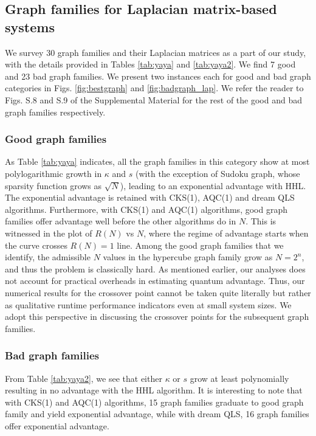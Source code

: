 \documentclass[%
 reprint,
 superscriptaddress,
 amsmath,amssymb,
 aps,
 pra,
floatfix,
nofootinbib,
]{revtex4-2}
\theoremstyle{definition}
\theoremstyle{remark}
\begin{document}
\subsection{Graph families for Laplacian matrix-based systems} \label{sec:LG} 

We survey 30 graph families and their Laplacian matrices as a part of our study, with the details provided in Tables \ref{tab:yaya} and \ref{tab:yaya2}. We find 7 good and 23 bad graph families. We present two instances each for good and bad graph categories in Figs. \ref{fig:bestgraph} and \ref{fig:badgraph_lap}. We refer the reader to Figs. S.8 and S.9 of the Supplemental Material for the rest of the good and bad graph families respectively. 

\subsubsection{Good graph families} 

As Table \ref{tab:yaya} indicates, all the graph families in this category show at most polylogarithmic growth in $\kappa$ and $s$ (with the exception of Sudoku graph, whose sparsity function grows as $\sqrt{N}$), leading to an exponential advantage with HHL. The exponential advantage is retained with CKS(1), AQC(1) and dream QLS algorithms. Furthermore, with CKS(1) and AQC(1) algorithms, good graph families offer advantage well before the other algorithms do in $N$. This is witnessed in the plot of $R(N)$ vs $N$, where the regime of advantage starts when the curve crosses $R({N})=1$ line. Among the good graph families that we identify, the admissible $N$ values in the hypercube graph family grow as $N=2^n$, and thus the problem is classically hard. As mentioned earlier, our analyses does not account for practical overheads in estimating quantum advantage. Thus, our numerical results for the crossover point cannot be taken quite literally but rather as qualitative runtime performance indicators even at small system sizes. We adopt this perspective in discussing the crossover points for the subsequent graph families. 

\subsubsection{Bad graph families} 

From Table \ref{tab:yaya2}, we see that either $\kappa$ or $s$ grow at least polynomially resulting in no advantage with the HHL algorithm. It is interesting to note that with CKS(1) and AQC(1) algorithms, 15 graph families graduate to good graph family and yield exponential advantage, while with dream QLS, 16 graph families offer exponential advantage. 
\end{document}
